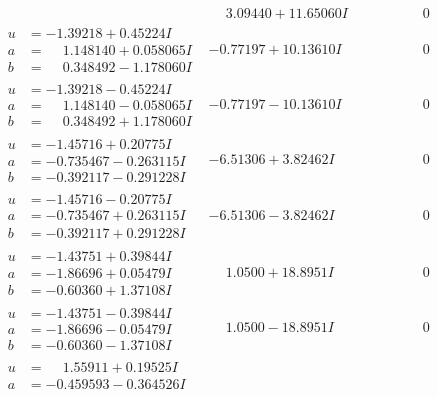\documentclass[1p]{elsarticle_modified}
\theoremstyle{definition}
\begin{document}
$$\begin{array}{c|c|c}
 & \phantom{-}3.09440 + 11.65060 I & \phantom{-0.000000 } 0 \\ \hline\begin{aligned}
u &= -1.39218 + 0.45224 I \\
a &= \phantom{-}1.148140 + 0.058065 I \\
b &= \phantom{-}0.348492 - 1.178060 I\end{aligned}
 & -0.77197 + 10.13610 I & \phantom{-0.000000 } 0 \\ \hline\begin{aligned}
u &= -1.39218 - 0.45224 I \\
a &= \phantom{-}1.148140 - 0.058065 I \\
b &= \phantom{-}0.348492 + 1.178060 I\end{aligned}
 & -0.77197 - 10.13610 I & \phantom{-0.000000 } 0 \\ \hline\begin{aligned}
u &= -1.45716 + 0.20775 I \\
a &= -0.735467 - 0.263115 I \\
b &= -0.392117 - 0.291228 I\end{aligned}
 & -6.51306 + 3.82462 I & \phantom{-0.000000 } 0 \\ \hline\begin{aligned}
u &= -1.45716 - 0.20775 I \\
a &= -0.735467 + 0.263115 I \\
b &= -0.392117 + 0.291228 I\end{aligned}
 & -6.51306 - 3.82462 I & \phantom{-0.000000 } 0 \\ \hline\begin{aligned}
u &= -1.43751 + 0.39844 I \\
a &= -1.86696 + 0.05479 I \\
b &= -0.60360 + 1.37108 I\end{aligned}
 & \phantom{-}1.0500 + 18.8951 I & \phantom{-0.000000 } 0 \\ \hline\begin{aligned}
u &= -1.43751 - 0.39844 I \\
a &= -1.86696 - 0.05479 I \\
b &= -0.60360 - 1.37108 I\end{aligned}
 & \phantom{-}1.0500 - 18.8951 I & \phantom{-0.000000 } 0 \\ \hline\begin{aligned}
u &= \phantom{-}1.55911 + 0.19525 I \\
a &= -0.459593 - 0.364526 I \\

\end{aligned}
\end{array}$$
\end{document}
